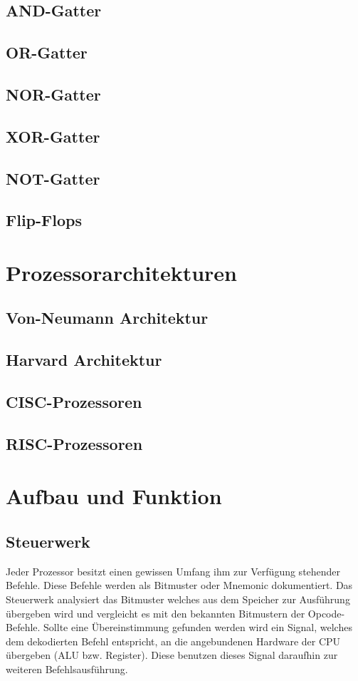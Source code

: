 \documentclass[12pt]{article}
\begin{document}
\subsection{AND-Gatter}
\subsection{OR-Gatter}
\subsection{NOR-Gatter}
\subsection{XOR-Gatter}
\subsection{NOT-Gatter}
\subsection{Flip-Flops}

\section{Prozessorarchitekturen}
\subsection{Von-Neumann Architektur}
\subsection{Harvard Architektur}
\subsection{CISC-Prozessoren}
\subsection{RISC-Prozessoren}

\section{Aufbau und Funktion}
\subsection{Steuerwerk}
Jeder Prozessor besitzt einen gewissen Umfang ihm zur Verfügung stehender Befehle. Diese Befehle werden als Bitmuster oder Mnemonic dokumentiert. 
Das Steuerwerk analysiert das Bitmuster welches aus dem Speicher zur Ausführung übergeben wird und vergleicht es mit den bekannten Bitmustern der Opcode-Befehle. Sollte eine Übereinstimmung gefunden werden wird ein Signal, welches dem dekodierten Befehl entspricht, an die angebundenen Hardware der CPU übergeben (ALU bzw. Register). Diese benutzen dieses Signal daraufhin zur weiteren Befehlsausführung.\cite{computerarchitecture2007}
\end{document}
